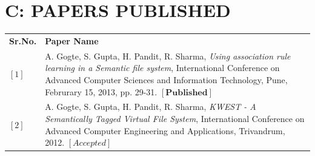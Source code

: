 {}
\chapter*{C: PAPERS PUBLISHED}

\begin{center}
\begin{tabular}{p{1cm}p{12cm}}

\textbf{Sr.No.} & \textbf{Paper Name} \\ 

$[1]$ & A. Gogte, S. Gupta, H. Pandit, R. Sharma, \textit{Using association rule learning in a Semantic file system}, International Conference on Advanced Computer Sciences and Information Technology, Pune, Februrary 15, 2013, 
pp. 29-31. $[\textbf{Published}]$\\

$[2]$ & A. Gogte, S. Gupta, H. Pandit, R. Sharma, \textit{KWEST - A Semantically Tagged Virtual File System}, International Conference on Advanced Computer Engineering and Applications, Trivandrum, 2012. $[Accepted]$\\

\end{tabular}
\end{center}

